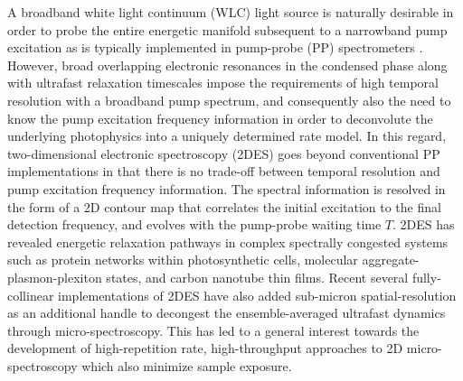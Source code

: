 \documentclass[%
aip,
amsmath,amssymb,
preprint,%
]{revtex4-2}
\begin{document}
A broadband white light continuum (WLC) light source is naturally desirable in order to probe the entire energetic manifold subsequent to a narrowband pump excitation as is typically implemented in pump-probe (PP) spectrometers \cite{Lang2018}. However, broad overlapping electronic resonances in the condensed phase along with ultrafast relaxation timescales impose the requirements of high temporal resolution with a broadband pump spectrum, and consequently also the need to know the pump excitation frequency information in order to deconvolute the underlying photophysics into a uniquely determined rate model\cite{Dostal2016}. In this regard, two-dimensional electronic spectroscopy (2DES) goes beyond conventional PP implementations in that there is no trade-off between temporal resolution and pump excitation frequency information. The spectral information is resolved in the form of a 2D contour map that correlates the initial excitation to the final detection frequency, and evolves with the pump-probe waiting time $T$. 2DES has revealed energetic relaxation pathways in complex spectrally congested systems such as protein networks within photosynthetic cells\cite{Dostal2016,Dahlberg2017}, molecular aggregate-plasmon-plexiton states\cite{Shapiro2021}, and carbon nanotube thin films\cite{Mehlenbacher2015}. Recent several fully-collinear implementations\cite{OgilvieARPC,Tiwari2021} of 2DES have also added sub-micron spatial-resolution as an additional handle to decongest the ensemble-averaged ultrafast dynamics through micro-spectroscopy. This has led to a general interest towards the development of high-repetition rate, high-throughput approaches to 2D micro-spectroscopy which also minimize sample exposure.\\
\end{document}
